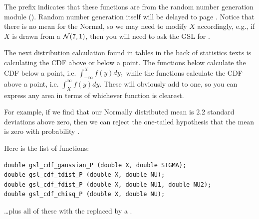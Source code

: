 The prefix  indicates that these
functions are from the random number generation module
(). Random number generation itself will be
delayed to page \pageref{randomnumbers}. Notice that there is no mean
for the Normal, so we may need to modify $X$ accordingly, e.g., if $X$
is drawn from a ${\cal N}(7,1)$, then you will need to ask the GSL for 
.


The next distribution calculation found in tables in the back of
statistics texts is calculating the CDF above or below a point. 
The functions below calculate the CDF below a point, i.e.
$\int_{-\infty}^X f(y) dy,$
while the functions calculate the CDF above a point, i.e.
$\int^{\infty}_X f(y) dy.$
These will obviously add to one, so you can express any area in terms of whichever function is clearest.

For example, if we find that our Normally distributed mean is 2.2 standard
deviations above zero, then we can reject the one-tailed hypothesis that
the mean is zero with probability .

Here is the list of functions:
\begin{lstlisting}
double gsl_cdf_gaussian_P (double X, double SIGMA);
double gsl_cdf_tdist_P (double X, double NU);
double gsl_cdf_fdist_P (double X, double NU1, double NU2);
double gsl_cdf_chisq_P (double X, double NU);
\end{lstlisting}
\dots plus all of these with the  replaced by a .


